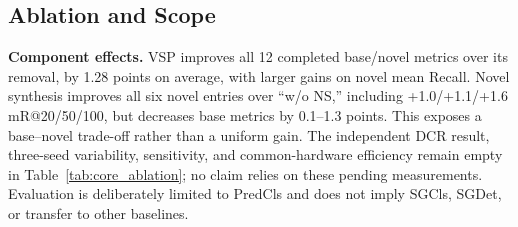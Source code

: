 \subsection{Ablation and Scope}
\label{sec:exp_ablation}



\textbf{Component effects.}
VSP improves all 12 completed base/novel metrics over its removal, by 1.28
points on average, with larger gains on novel mean Recall. Novel synthesis
improves all six novel entries over ``w/o NS,'' including +1.0/+1.1/+1.6
mR@20/50/100, but decreases base metrics by 0.1--1.3 points. This exposes a
base--novel trade-off rather than a uniform gain. The independent DCR result,
three-seed variability, sensitivity, and common-hardware efficiency remain
empty in Table~\ref{tab:core_ablation}; no claim relies on these pending
measurements. Evaluation is deliberately limited to PredCls and does not imply
SGCls, SGDet, or transfer to other baselines.
